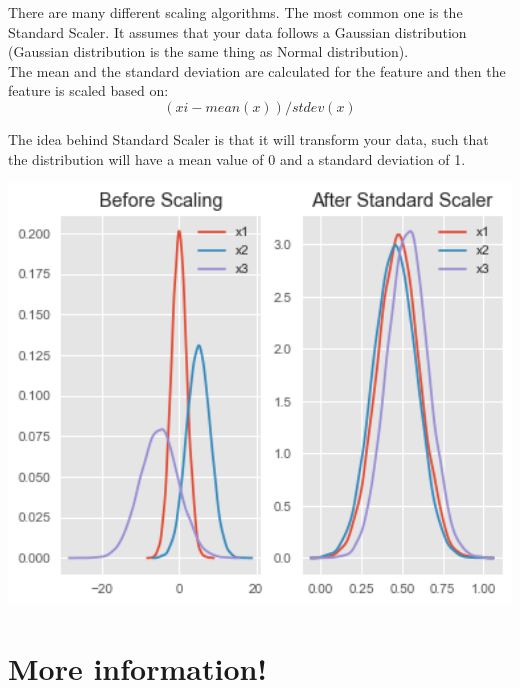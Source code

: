 \documentclass{42-en}
\begin{document}
There are many different scaling algorithms. The most common one is the Standard Scaler. It assumes that your data follows a Gaussian distribution (Gaussian distribution is the same thing as Normal distribution).\\

The mean and the standard deviation are calculated for the feature and then the feature is scaled based on:
\[ (xi - mean(x)) / stdev(x) \]

The idea behind Standard Scaler is that it will transform your data, such that the distribution will have a mean value of 0 and a standard deviation of 1.\\

\centerline{\includegraphics[width=150mm]{images/std_scale.png}}

\newpage

\section*{More information!}
\end{document}
